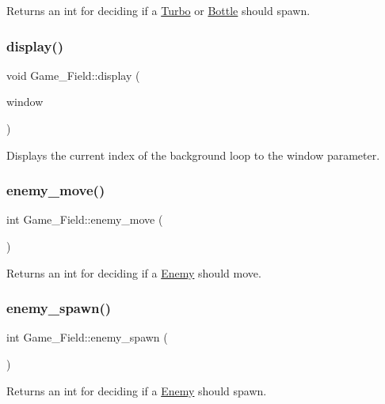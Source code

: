 Returns an int for deciding if a \hyperlink{classTurbo}{Turbo} or \hyperlink{classBottle}{Bottle} should spawn. \mbox{\label{classGame__Field_a60de25cfcba5f7f67a5bf510cdc13326}} 
\subsubsection{\texorpdfstring{display()}{display()}}
{\footnotesize\ttfamily void Game\+\_\+\+Field\+::display (\begin{DoxyParamCaption}\item[{sf\+::\+Render\+Window \&}]{window }\end{DoxyParamCaption})}

Displays the current index of the background loop to the window parameter. \mbox{\label{classGame__Field_ae174d69a829b073c9b64e9f15e57870d}} 
\subsubsection{\texorpdfstring{enemy\+\_\+move()}{enemy\_move()}}
{\footnotesize\ttfamily int Game\+\_\+\+Field\+::enemy\+\_\+move (\begin{DoxyParamCaption}{ }\end{DoxyParamCaption})}

Returns an int for deciding if a \hyperlink{classEnemy}{Enemy} should move. \mbox{\label{classGame__Field_a2a328d2a97c5f90a2cd35a89e1cedb01}} 
\subsubsection{\texorpdfstring{enemy\+\_\+spawn()}{enemy\_spawn()}}
{\footnotesize\ttfamily int Game\+\_\+\+Field\+::enemy\+\_\+spawn (\begin{DoxyParamCaption}{ }\end{DoxyParamCaption})}

Returns an int for deciding if a \hyperlink{classEnemy}{Enemy} should spawn. \mbox{\label{classGame__Field_ad2f37858f33af0caf2cd4ba0107a9a24}} 
